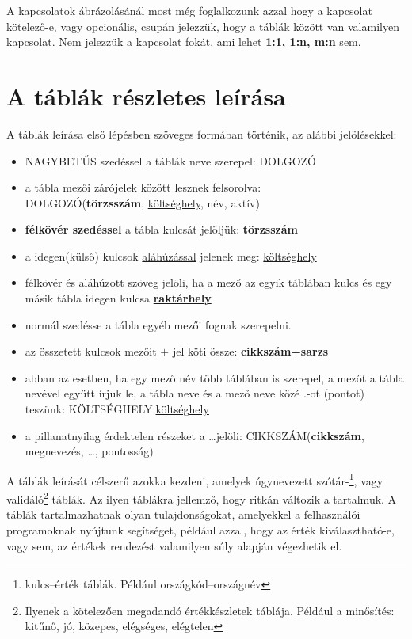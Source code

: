 \documentclass[a4paper,12pt]{report}
\newcommand{\PK}[1]{\textbf{#1}}
\newcommand{\FK}[1]{\underline{#1}}
\newcommand{\TABLA}[1]{\noindent\MakeUppercase{#1}}
\newcommand{\TMEZO}[2]{\MakeUppercase{#1}.{\underline{#2}}}
\begin{document}
A kapcsolatok ábrázolásánál most még foglalkozunk azzal hogy a kapcsolat 
kötelező-e, vagy opcionális, csupán jelezzük, hogy a táblák között van 
valamilyen kapcsolat. Nem jelezzük a kapcsolat fokát, ami lehet \textbf{1:1, 
1:n, m:n} sem.

\section{A táblák részletes leírása}
A táblák leírása első lépésben szöveges formában történik, az alábbi 
jelölésekkel:
\begin{itemize}
 \item \TABLA{nagybetűs} szedéssel a táblák neve szerepel: \TABLA{dolgozó}
 \item a tábla mezői zárójelek között lesznek felsorolva:\\ 
 \TABLA{DOLGOZÓ}(\PK{törzsszám}, \FK{költséghely}, név, aktív)
 \item \PK{félkövér szedéssel} a tábla kulcsát jelöljük: \PK{törzsszám}
 \item a idegen(külső) kulcsok \FK{aláhúzással} jelenek meg: 
 \FK{költséghely}
 \item félkövér és aláhúzott szöveg jelöli, ha a mező az egyik táblában kulcs 
és egy másik tábla idegen kulcsa \PK{\FK{raktárhely}} 
\item normál szedésse a tábla egyéb mezői fognak szerepelni.
\item az összetett kulcsok mezőit $+$ jel köti össze: \PK{cikkszám+sarzs}
\item abban az esetben, ha egy mező név több táblában is szerepel, a mezőt 
a tábla nevével együtt írjuk le, a tábla neve és a mező neve közé .-ot 
(pontot) teszünk: \TMEZO{KÖLTSÉGHELY}{költséghely}
\item a pillanatnyilag érdektelen részeket a \dots jelöli:
\TABLA{cikkszám}(\PK{cikkszám}, megnevezés, \dots, pontosság)
\end{itemize}

A táblák leírását célszerű azokka kezdeni, amelyek úgynevezett 
szótár-\footnote{kulcs--érték táblák. Például országkód--országnév}, vagy
validáló\footnote{Ilyenek a kötelezően megadandó értékkészletek táblája. 
Például a minősítés: kitűnő, jó, közepes, elégséges, elégtelen} táblák.
Az ilyen táblákra jellemző, hogy ritkán változik a tartalmuk. A táblák 
tartalmazhatnak olyan tulajdonságokat, amelyekkel a felhasználói
programoknak nyújtunk segítséget, például azzal, hogy az érték
kiválasztható-e, vagy sem, az értékek rendezést valamilyen súly alapján 
végezhetik el.
\end{document}
